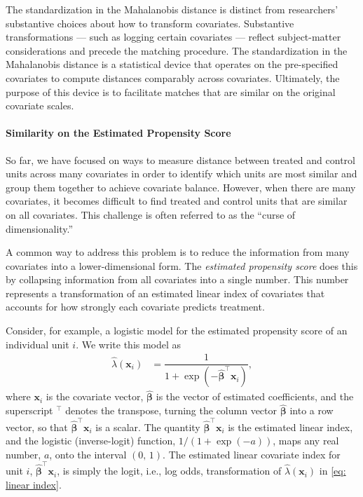 \documentclass[twoside,11pt]{article}
\begin{document}
The standardization in the Mahalanobis distance is distinct from
researchers' substantive choices about how to transform covariates.
Substantive transformations --- such as logging certain covariates ---
reflect subject-matter considerations and precede the matching
procedure. The standardization in the Mahalanobis distance is a
statistical device that operates on the pre-specified covariates to
compute distances comparably across covariates. Ultimately, the purpose of this device is to facilitate matches that are similar on the original
covariate scales.

\paragraph{Similarity on the Estimated Propensity
Score}\label{similarity-on-the-estimated-propensity-score}

So far, we have focused on ways to measure distance between treated and
control units across many covariates in order to identify which units
are most similar and group them together to achieve covariate balance.
However, when there are many covariates, it becomes difficult to find
treated and control units that are similar on all covariates. This
challenge is often referred to as the ``curse of dimensionality.''

A common way to address this problem is to reduce the information from
many covariates into a lower-dimensional form. The \emph{estimated
propensity score} does this by collapsing information from all
covariates into a single number. This number represents a transformation
of an estimated linear index of covariates that accounts for how
strongly each covariate predicts treatment.

Consider, for example, a logistic model for the estimated propensity
score of an individual unit \(i\). We write this model as
\begin{align} \label{eq: linear index}
\hat{\lambda}(\bm{x}_i) & = \dfrac{1}{1 + \exp(-\bm{\hat{\beta}}^{\top}\bm{x}_i)},
\end{align} where \(\bm{x}_i\) is the covariate vector,
\(\bm{\hat{\beta}}\) is the vector of estimated coefficients, and the
superscript \(^{\top}\) denotes the transpose, turning the column vector
\(\bm{\hat{\beta}}\) into a row vector, so that \(\bm{\hat{\beta}}^{\top}\bm{x}_i\) is a scalar. The quantity
\(\bm{\hat{\beta}}^{\top}\bm{x}_i\) is the estimated linear index, and
the logistic (inverse-logit) function, \(1 / (1 + \exp(-a))\), maps any
real number, \(a\), onto the interval \((0, \, 1)\). The estimated
linear covariate index for unit \(i\),
\(\bm{\hat{\beta}}^{\top}\bm{x}_i\), is simply the logit, i.e., log
odds, transformation of \(\hat{\lambda}(\bm{x}_i)\) in
\eqref{eq: linear index}.
\end{document}
